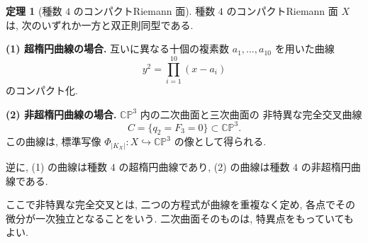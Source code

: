 \documentclass[dvipdfmx,a4paper,11pt]{article} %
\newcommand{\C}{\mathbb{C}}
\theoremstyle{definition}
\newtheorem{thm}{定理}[section]
\numberwithin{equation}{section}
\begin{document}
\begin{thm}[種数 $4$ のコンパクトRiemann 面]
\label{thm-genus-four}
種数 $4$ のコンパクトRiemann 面 $X$ は,
次のいずれか一方と双正則同型である.

\medskip
\noindent
\textbf{(1) 超楕円曲線の場合.}
互いに異なる十個の複素数 $a_1,\ldots,a_{10}$ を用いた曲線
\[
y^2=\prod_{i=1}^{10}(x-a_i)
\]
のコンパクト化.

\medskip
\noindent
\textbf{(2) 非超楕円曲線の場合.}
$\C\mathbb P^3$ 内の二次曲面と三次曲面の
非特異な完全交叉曲線
\[
C=\{q_2=F_3=0\}\subset\C\mathbb P^3.
\]
この曲線は, 標準写像
$\Phi_{|K_X|}:X\hookrightarrow\C\mathbb P^3$ の像として得られる.

\medskip
逆に, (1) の曲線は種数 $4$ の超楕円曲線であり,
(2) の曲線は種数 $4$ の非超楕円曲線である.

ここで非特異な完全交叉とは,
二つの方程式が曲線を重複なく定め,
各点でその微分が一次独立となることをいう.
二次曲面そのものは, 特異点をもっていてもよい.
\end{thm}
\end{document}
